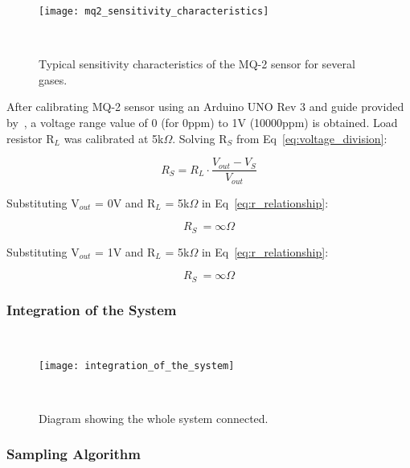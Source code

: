 \begin{figure}[ht]
    \centering\texttt{[image: mq2\_sensitivity\_characteristics]}
    \caption{Typical sensitivity characteristics of the MQ-2 sensor for several gases.}
~\label{fig:mq2_sensitivity_characteristics}
\end{figure}

After calibrating MQ-2 sensor using an Arduino UNO Rev 3 and guide provided by~\cite{grove_2023}, a voltage range value of 0 (for 0ppm) to 1V (10000ppm) is obtained. Load resistor R$_{L}$ was calibrated at 5k$\Omega$. Solving R$_{S}$ from Eq~\ref{eq:voltage_division}:

\begin{equation}
    R_{S} = R_{L} \cdot \frac{V_{out} - V_{S}}{V_{out}}
    \label{eq:r_relationship}
\end{equation}

Substituting V$_{out}$ = 0V and R$_{L}$ = 5k$\Omega$ in Eq~\ref{eq:r_relationship}:

\begin{equation}
    R_{S} ~= \infty \Omega
    \label{eq:rs_at_0v}
\end{equation}

Substituting V$_{out}$ = 1V and R$_{L}$ = 5k$\Omega$ in Eq~\ref{eq:r_relationship}:

\begin{equation}
    R_{S} ~= \infty \Omega
    \label{eq:rs_at_1v}
\end{equation}


\subsubsection{Integration of the System}
~\label{sec:methodology:dev_methodology:iots}
\hspace{8pt}



\begin{figure}[ht]
    \centering\texttt{[image: integration\_of\_the\_system]}
    \caption{Diagram showing the whole system connected.}
~\label{fig:integration_of_the_system}
\end{figure}


\subsubsection{Sampling Algorithm}
~\label{sec:methodology:dev_methodology:sa}
\hspace{8pt}


